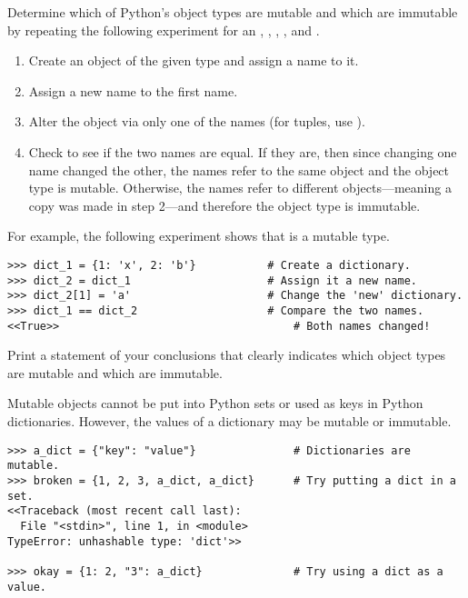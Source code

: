 \begin{problem} %
Determine which of Python's object types are mutable and which are immutable by repeating the following experiment for an , , , , and .
\begin{enumerate}
    \item Create an object of the given type and assign a name to it.
    \item Assign a new name to the first name.
    \item Alter the object via only one of the names (for tuples, use ).
    \item Check to see if the two names are equal.
    If they are, then since changing one name changed the other, the names refer to the same object and the object type is mutable.
    Otherwise, the names refer to different objects---meaning a copy was made in step 2---and therefore the object type is immutable.
\end{enumerate}
For example, the following experiment shows that  is a mutable type.
\begin{lstlisting}
>>> dict_1 = {1: 'x', 2: 'b'}           # Create a dictionary.
>>> dict_2 = dict_1                     # Assign it a new name.
>>> dict_2[1] = 'a'                     # Change the 'new' dictionary.
>>> dict_1 == dict_2                    # Compare the two names.
<<True>>                                    # Both names changed!
\end{lstlisting}
Print a statement of your conclusions that clearly indicates which object types are mutable and which are immutable.
\end{problem}

\begin{warn} %
Mutable objects cannot be put into Python sets or used as keys in Python dictionaries.
However, the values of a dictionary may be mutable or immutable.
\begin{lstlisting}
>>> a_dict = {"key": "value"}               # Dictionaries are mutable.
>>> broken = {1, 2, 3, a_dict, a_dict}      # Try putting a dict in a set.
<<Traceback (most recent call last):
  File "<stdin>", line 1, in <module>
TypeError: unhashable type: 'dict'>>

>>> okay = {1: 2, "3": a_dict}              # Try using a dict as a value.
\end{lstlisting}
\end{warn}

